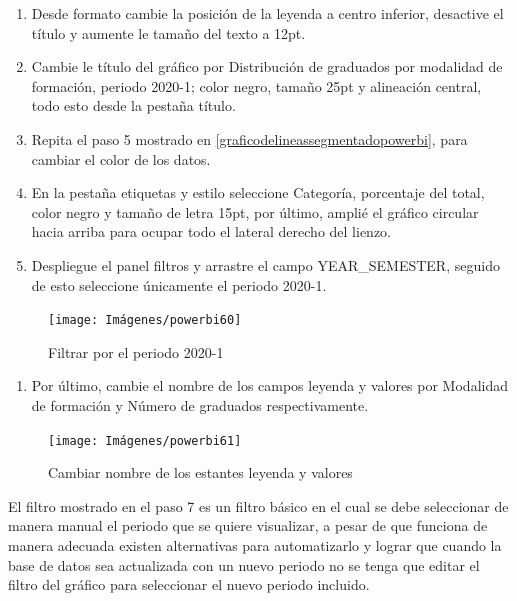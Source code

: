 \documentclass[
]{book}
\providecommand{\tightlist}{%
  \setlength{\itemsep}{0pt}\setlength{\parskip}{0pt}}
\begin{document}
\begin{enumerate}
\def\labelenumi{\arabic{enumi}.}
\setcounter{enumi}{2}
\item
  Desde formato cambie la posición de la leyenda a centro inferior, desactive el título y aumente le tamaño del texto a 12pt.
\item
  Cambie le título del gráfico por Distribución de graduados por modalidad de formación, periodo 2020-1; color negro, tamaño 25pt y alineación central, todo esto desde la pestaña título.
\item
  Repita el paso 5 mostrado en \ref{graficodelineassegmentadopowerbi}, para cambiar el color de los datos.
\item
  En la pestaña etiquetas y estilo seleccione Categoría, porcentaje del total, color negro y tamaño de letra 15pt, por último, amplié el gráfico circular hacia arriba para ocupar todo el lateral derecho del lienzo.
\item
  Despliegue el panel filtros y arrastre el campo YEAR\_SEMESTER, seguido de esto seleccione únicamente el periodo 2020-1.
\end{enumerate}

\begin{figure}

{\centering \texttt{[image: Imágenes/powerbi60]} 

}

\caption{Filtrar por el periodo 2020-1}\label{fig:paso7circular-fig}
\end{figure}

\begin{enumerate}
\def\labelenumi{\arabic{enumi}.}
\setcounter{enumi}{7}
\tightlist
\item
  Por último, cambie el nombre de los campos leyenda y valores por Modalidad de formación y Número de graduados respectivamente.
\end{enumerate}

\begin{figure}

{\centering \texttt{[image: Imágenes/powerbi61]} 

}

\caption{Cambiar nombre de los estantes leyenda y valores}\label{fig:paso8circular-fig}
\end{figure}

El filtro mostrado en el paso 7 es un filtro básico en el cual se debe seleccionar de manera manual el periodo que se quiere visualizar, a pesar de que funciona de manera adecuada existen alternativas para automatizarlo y lograr que cuando la base de datos sea actualizada con un nuevo periodo no se tenga que editar el filtro del gráfico para seleccionar el nuevo periodo incluido.
\end{document}
